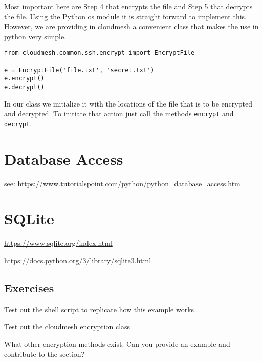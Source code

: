 Most important here are Step 4 that encrypts the file and Step 5 that
decrypts the file. Using the Python os module it is straight forward
to implement this. However, we are providing in cloudmesh a convenient
class that makes the use in python very simple.

\begin{verbatim}
from cloudmesh.common.ssh.encrypt import EncryptFile

e = EncryptFile('file.txt', 'secret.txt')
e.encrypt()
e.decrypt()
\end{verbatim}

In our class we initialize it with the locations of the file that is
to be encrypted and decrypted. To initiate that action just call the
methods \verb|encrypt| and \verb|decrypt|.

\section{Database Access}\label{database-access}


see: \url{https://www.tutorialspoint.com/python/python_database_access.htm}

\section{SQLite}


\url{https://www.sqlite.org/index.html}

\url{https://docs.python.org/3/library/sqlite3.html}

\subsection{Exercises}

\begin{exercise}
\label{E:Encryption.1} Test out the shell script to replicate how this
  example works
\end{exercise}

\begin{exercise}
  \label{E:Encryption.2} Test out the cloudmesh encryption class
\end{exercise}

\begin{exercise}
  \label{E:Encryption.3} What other encryption methods exist. Can you
  provide an example and contribute to the section?
\end{exercise}


